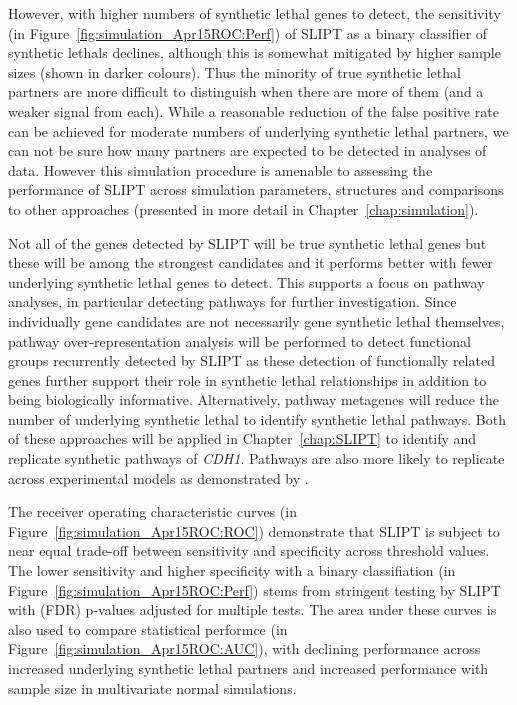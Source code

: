 However, with higher numbers of \gls{synthetic lethal} genes to detect, the sensitivity (in Figure~\ref{fig:simulation_Apr15ROC:Perf}) of \gls{SLIPT} as a binary classifier of \glspl{synthetic lethal} declines, although this is somewhat mitigated by higher sample sizes (shown in darker colours). Thus the minority of true \gls{synthetic lethal} partners are more difficult to distinguish when there are more of them (and a weaker  signal from each). While a reasonable reduction of the false positive rate can be achieved for moderate numbers of underlying \gls{synthetic lethal} partners, we can not be sure how many partners are expected to be detected in analyses of  data. However this simulation procedure is amenable to assessing the performance of \gls{SLIPT} across simulation parameters,  structures and comparisons to other approaches (presented in more detail in Chapter~\ref{chap:simulation}).

Not all of the genes detected by \gls{SLIPT} will be true \gls{synthetic lethal} genes but these will be among the strongest candidates and it performs better with fewer underlying \gls{synthetic lethal} genes to detect. This supports a focus on pathway analyses, in particular detecting pathways for further investigation. Since individually gene candidates are not necessarily gene \gls{synthetic lethal} themselves, pathway over-representation analysis will be performed to detect functional groups recurrently detected by \gls{SLIPT} as these detection of functionally related genes further support their role in \gls{synthetic lethal} relationships in addition to being biologically informative. Alternatively, pathway \glspl{metagene} will reduce the number of underlying \gls{synthetic lethal} to identify \gls{synthetic lethal} pathways. Both of these approaches will be applied in Chapter~\ref{chap:SLIPT} to identify and replicate synthetic pathways of \textit{CDH1}. Pathways are also more likely to replicate across experimental models as demonstrated by \citet{Dixon2008}.
 
The receiver operating characteristic curves (in Figure~\ref{fig:simulation_Apr15ROC:ROC}) demonstrate that \gls{SLIPT} is subject to near equal trade-off between sensitivity and specificity across threshold values. The lower sensitivity and higher specificity with a binary classifiation (in Figure~\ref{fig:simulation_Apr15ROC:Perf}) stems from stringent testing by \gls{SLIPT} with (\gls{FDR}) p-values adjusted for multiple tests. The area under these curves is also used to compare statistical performce (in Figure~\ref{fig:simulation_Apr15ROC:AUC}), with declining performance across increased underlying \gls{synthetic lethal} partners and increased performance with sample size in multivariate normal simulations.

